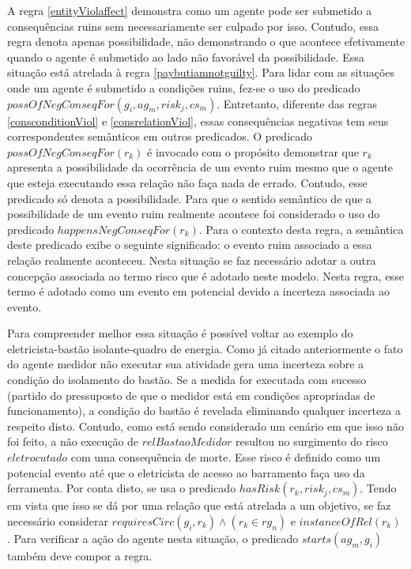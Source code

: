 A regra \ref{entityViolaffect} demonstra como um agente pode ser submetido a consequências ruins sem necessariamente ser culpado por isso. Contudo, essa regra denota apenas possibilidade, não demonstrando o que acontece efetivamente quando o agente é submetido ao lado não favorável da possibilidade. Essa situação está atrelada à regra \ref{paybutiamnotguilty}. Para lidar com as situações onde um agente é submetido a condições ruins, fez-se o uso do predicado $possOfNegConseqFor(g_i,ag_m,risk_j,cs_m) $. Entretanto, diferente das regras \ref{consconditionViol} e \ref{consrelationViol}, essas consequências negativas tem seus correspondentes semânticos em outros predicados. O predicado $possOfNegConseqFor(r_k)$ é invocado com o propósito demonstrar que $r_k$ apresenta a possibilidade da ocorrência de um evento ruim mesmo que o agente que esteja executando essa relação não faça nada de errado. Contudo, esse predicado só denota a possibilidade. Para que o sentido semântico de que a possibilidade de um evento ruim realmente acontece foi considerado o uso do predicado $happensNegConseqFor(r_k)$. Para o contexto desta regra, a semântica deste predicado exibe o seguinte significado: o evento ruim associado a essa relação realmente aconteceu. Nesta situação se faz necessário adotar a outra concepção associada ao termo risco que é adotado neste modelo. Nesta regra, esse termo é adotado como um evento em potencial devido a incerteza associada ao evento. 

Para compreender melhor essa situação é possível voltar ao exemplo do eletricista-bastão isolante-quadro de energia. Como já citado anteriormente o fato do agente medidor não executar sua atividade gera uma incerteza sobre a condição do isolamento do bastão. Se a medida for executada com sucesso (partido do pressuposto de que o medidor está em condições apropriadas de funcionamento), a condição do bastão é revelada eliminando qualquer incerteza a respeito disto. Contudo, como está sendo considerado um cenário em que isso não foi feito, a não execução de $relBastaoMedidor$ resultou no surgimento do risco $eletrocutado$ com uma consequência de morte. Esse risco é definido como um potencial evento até que o eletricista de acesso ao barramento faça uso da ferramenta. Por conta disto, se usa o predicado $hasRisk(r_k,risk_j,cs_m)$. Tendo em vista que isso se dá por uma relação que está atrelada a um objetivo, se faz necessário considerar $requiresCirc(g_i,r_k) \wedge (r_k \in rg_n) $ e  $instanceOfRel(r_k)$ . Para verificar a ação do agente nesta situação, o predicado $starts(ag_m,g_i)$ também deve compor a regra.


